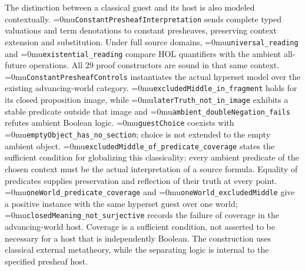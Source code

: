 \documentclass[11pt]{article}
\newcommand{\leanname}[1]{\textup{\Urlmuskip=0mu\relax\nolinkurl{#1}}}
\theoremstyle{definition}
\theoremstyle{remark}
\begin{document}
The distinction between a classical guest and its host is also modeled
contextually. \leanname{ConstantPresheafInterpretation} sends complete typed
valuations and term denotations to constant presheaves, preserving context
extension and substitution. Under full source domains,
\leanname{universal_reading} and \leanname{existential_reading} compare HOL
quantifiers with the ambient all-future operations. All 29 proof constructors
are sound in that same context. \leanname{ConstantPresheafControls} instantiates
the actual hyperset model over the existing advancing-world category.
\leanname{excludedMiddle_in_fragment} holds for its closed proposition image,
while \leanname{laterTruth_not_in_image} exhibits a stable predicate outside
that image and \leanname{ambient_doubleNegation_fails} refutes ambient Boolean
logic. \leanname{guestChoice} coexists with
\leanname{emptyObject_has_no_section}; choice is not extended to the empty
ambient object.
\leanname{excludedMiddle_of_predicate_coverage} states the sufficient condition
for globalizing this classicality: every ambient predicate of the chosen
context must be the actual interpretation of a source formula. Equality of
predicates supplies preservation and reflection of their truth at every point.
\leanname{oneWorld_predicate_coverage} and \leanname{oneWorld_excludedMiddle}
give a positive instance with the same hyperset guest over one world;
\leanname{closedMeaning_not_surjective} records the failure of coverage in
the advancing-world host. Coverage is a sufficient condition, not asserted to
be necessary for a host that is independently Boolean.
The construction uses classical external metatheory, while
the separating logic is internal to the specified presheaf host.
\end{document}
